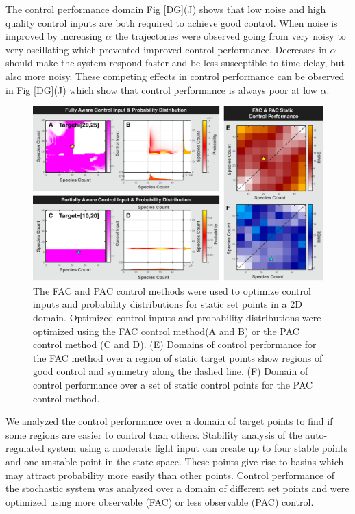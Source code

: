 \documentclass[12pt]{iopart}
\begin{document}
The control performance domain Fig \ref{DG}(J) shows that low noise and high quality control inputs are both required to achieve good control. When noise is improved by increasing $\alpha$ the trajectories were observed going from very noisy to very oscillating which prevented improved control performance. Decreases in $\alpha$ should make the system respond faster and be less susceptible to time delay, but also more noisy. These competing effects in control performance can be observed in Fig \ref{DG}(J) which show that control performance is always poor at low $\alpha$.


\begin{figure}
\begin{center}
\includegraphics[width=1\textwidth]{StaticControl.pdf}
\vspace{-0.1in}
\caption{The FAC and PAC control methods were used to optimize control inputs and probability distributions for static set points in a 2D domain.  Optimized control inputs and probability distributions were optimized using the FAC control method(A and B) or the PAC control method (C and D). (E) Domains of control performance for the FAC method over a region of static target points show regions of good control and symmetry along the dashed line. (F) Domain of control performance over a set of static control points for the PAC control method.} 
\label{CtrlP}
\end{center}
\vspace{-0.2in}
\end{figure}

We analyzed the control performance over a domain of target points to find if some regions are easier to control than others. Stability analysis of the auto-regulated system using a moderate light input can create up to four stable points and one unstable point in the state space.  These points give rise to basins which may attract probability more easily than other points. Control performance of the stochastic system was analyzed over a domain of different set points and were optimized using more observable (FAC) or less observable (PAC) control.
\end{document}
